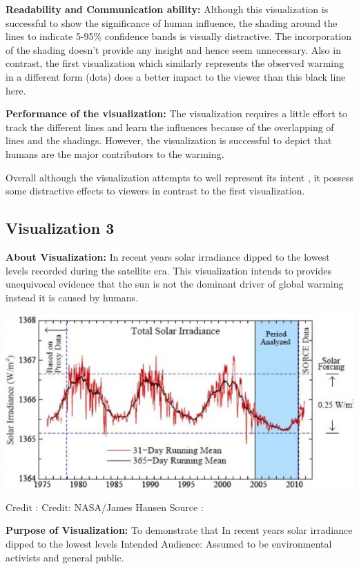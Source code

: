 \documentclass[]{book}
\begin{document}
\textbf{Readability and Communication ability:} Although this visualization is successful to show the significance of human influence, the shading around the lines to indicate 5-95\% confidence bands is visually distractive. The incorporation of the shading doesn't provide any insight and hence seem unnecessary. Also in contrast, the first visualization which similarly represents the observed warming in a different form (dots) does a better impact to the viewer than this black line here.

\textbf{Performance of the visualization:} The visualization requires a little effort to track the different lines and learn the influences because of the overlapping of lines and the shadings. However, the visualization is successful to depict that humans are the major contributors to the warming.

Overall although the visualization attempts to well represent its intent , it possess some distractive effects to viewers in contrast to the first visualization.

\hypertarget{visualization-3}{%
\subsection{Visualization 3}\label{visualization-3}}

\textbf{About Visualization:} In recent years solar irradiance dipped to the lowest levels recorded during the satellite era. This visualization intends to provides unequivocal evidence that the sun is not the dominant driver of global warming instead it is caused by humans.

\includegraphics{images/Vz4-Solar.png}

Credit : Credit: NASA/James Hansen
Source : \citep{NASA}

\textbf{Purpose of Visualization:} To demonstrate that In recent years solar irradiance dipped to the lowest levels
Intended Audience: Assumed to be environmental activists and general public.
\end{document}
